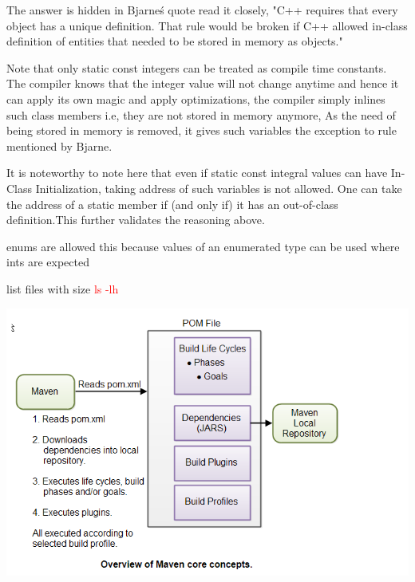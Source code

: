 \documentclass[a4paper]{tufte-handout}
\begin{document}
The answer is hidden in Bjarne\'s quote read it closely,
"C++ requires that every object has a unique definition. That rule would be broken if C++ allowed in-class definition of entities that needed to be stored in memory as objects."

Note that only static const integers can be treated as compile time constants. The compiler knows that the integer value will not change anytime and hence it can apply its own magic and apply optimizations, the compiler simply inlines such class members i.e, they are not stored in memory anymore, As the need of being stored in memory is removed, it gives such variables the exception to rule mentioned by Bjarne.

It is noteworthy to note here that even if static const integral values can have In-Class Initialization, taking address of such variables is not allowed. One can take the address of a static member if (and only if) it has an out-of-class definition.This further validates the reasoning above.

enums are allowed this because values of an enumerated type can be used where ints are expected

list files with size \textcolor{red}{ls -lh}


\includegraphics[width=\textwidth]{pics/maven}

\end{document}
